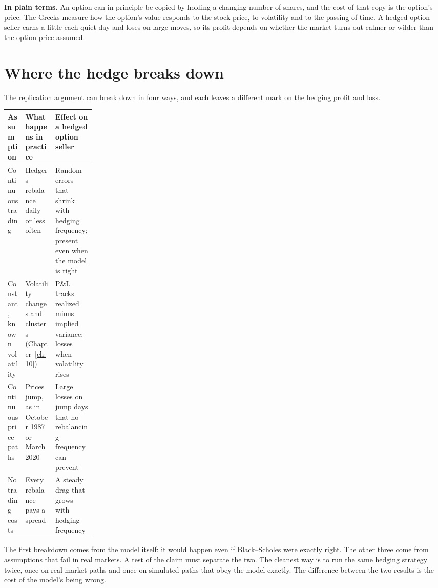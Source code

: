 \noindent\textbf{In plain terms.} An option can in principle be copied by holding a changing number of shares, and the cost of that copy is the option's price. The Greeks measure how the option's value responds to the stock price, to volatility and to the passing of time. A hedged option seller earns a little each quiet day and loses on large moves, so its profit depends on whether the market turns out calmer or wilder than the option price assumed.

\section{Where the hedge breaks down}
\label{sec:14-how}

The replication argument can break down in four ways, and each leaves a different mark on the hedging profit and loss.

\begin{center}
\small
\begin{tabularx}{0.9\linewidth}{@{}>{\raggedright\arraybackslash}p{0.2\linewidth}>{\raggedright\arraybackslash}X>{\raggedright\arraybackslash}X@{}}
\toprule
Assumption & What happens in practice & Effect on a hedged option seller \\
\midrule
Continuous trading & Hedgers rebalance daily or less often & Random errors that shrink with hedging frequency; present even when the model is right \\
Constant, known volatility & Volatility changes and clusters (Chapter~\ref{ch:10}) & P\&L tracks realized minus implied variance; losses when volatility rises \\
Continuous price paths & Prices jump, as in October 1987 or March 2020 & Large losses on jump days that no rebalancing frequency can prevent \\
No trading costs & Every rebalance pays a spread & A steady drag that grows with hedging frequency \\
\bottomrule
\end{tabularx}
\end{center}

The first breakdown comes from the model itself: it would happen even if Black--Scholes were exactly right. The other three come from assumptions that fail in real markets. A test of the claim must separate the two. The cleanest way is to run the same hedging strategy twice, once on real market paths and once on simulated paths that obey the model exactly. The difference between the two results is the cost of the model's being wrong.

